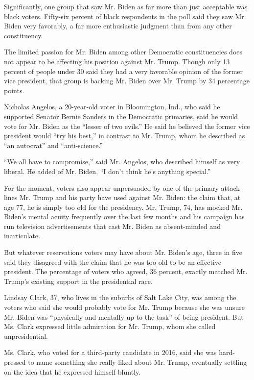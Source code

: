 Significantly, one group that saw Mr. Biden as far more than just
acceptable was black voters. Fifty-six percent of black respondents in
the poll said they saw Mr. Biden very favorably, a far more enthusiastic
judgment than from any other constituency.

The limited passion for Mr. Biden among other Democratic constituencies
does not appear to be affecting his position against Mr. Trump. Though
only 13 percent of people under 30 said they had a very favorable
opinion of the former vice president, that group is backing Mr. Biden
over Mr. Trump by 34 percentage points.

Nicholas Angelos, a 20-year-old voter in Bloomington, Ind., who said he
supported Senator Bernie Sanders in the Democratic primaries, said he
would vote for Mr. Biden as the ``lesser of two evils.'' He said he
believed the former vice president would ``try his best,'' in contrast
to Mr. Trump, whom he described as ``an autocrat'' and ``anti-science.''

``We all have to compromise,'' said Mr. Angelos, who described himself
as very liberal. He added of Mr. Biden, ``I don't think he's anything
special.''

For the moment, voters also appear unpersuaded by one of the primary
attack lines Mr. Trump and his party have used against Mr. Biden: the
claim that, at age 77, he is simply too old for the presidency. Mr.
Trump, 74, has mocked Mr. Biden's mental acuity frequently over the last
few months and his campaign has run television advertisements that cast
Mr. Biden as absent-minded and inarticulate.

But whatever reservations voters may have about Mr. Biden's age, three
in five said they disagreed with the claim that he was too old to be an
effective president. The percentage of voters who agreed, 36 percent,
exactly matched Mr. Trump's existing support in the presidential race.

Lindsay Clark, 37, who lives in the suburbs of Salt Lake City, was among
the voters who said she would probably vote for Mr. Trump because she
was unsure Mr. Biden was ``physically and mentally up to the task'' of
being president. But Ms. Clark expressed little admiration for Mr.
Trump, whom she called unpresidential.

Ms. Clark, who voted for a third-party candidate in 2016, said she was
hard-pressed to name something she really liked about Mr. Trump,
eventually settling on the idea that he expressed himself bluntly.

